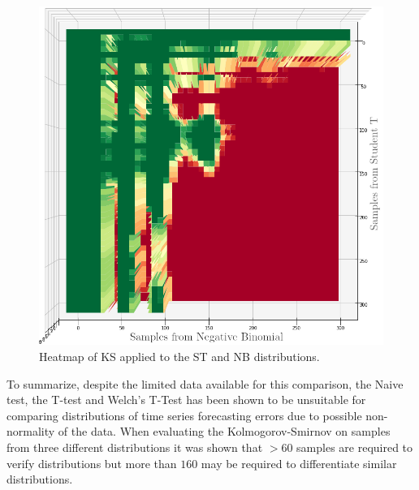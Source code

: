 \begin{figure}[h]
  \centering
  \includegraphics[width=\linewidth]{./img/hypothesis_test/deepar_heatmap_Y_student_t_X_neg_bin_ks_edited.png}
  \caption{Heatmap of KS applied to the ST and NB distributions.}
  \label{ks_student_t_neg_bin}
  \endminipage
\end{figure}

To summarize, despite the limited data available for this comparison, the Naive test, the T-test and Welch’s T-Test has been shown to be unsuitable for comparing distributions of time series forecasting errors due to possible non-normality of the data. When evaluating the Kolmogorov-Smirnov on samples from three different distributions it was shown that \(>60\) samples are required to verify distributions but more than \(160\) may be required to differentiate similar distributions.

